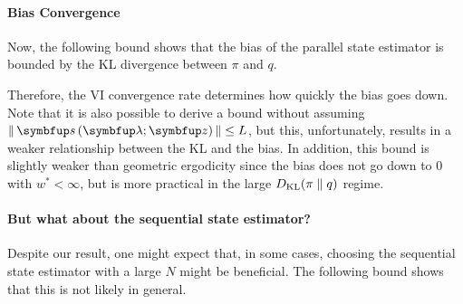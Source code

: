 \vspace{-0.05in}
\paragraph{Bias Convergence}
Now, the following bound shows that the bias of the parallel state estimator is bounded by the KL divergence between \(\pi\) and \(q\).
%

%
Therefore, the VI convergence rate determines how quickly the bias goes down.
Note that it is also possible to derive a bound without assuming \(\norm{\vs\left(\vlambda; \vz\right)} \leq L\), but this, unfortunately, results in a weaker relationship between the KL and the bias.
In addition, this bound is slightly weaker than geometric ergodicity since the bias does not go down to 0 with \(w^* < \infty\), but is more practical in the large \(D_{\mathrm{KL}}(\pi\parallel q)\) regime.




\vspace{-0.05in}
\paragraph{But what about the sequential state estimator?}
Despite our result, one might expect that, in some cases, choosing the sequential state estimator with a large \(N\) might be beneficial.
The following bound shows that this is not likely in general.

